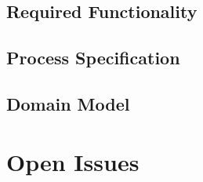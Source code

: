 \documentclass[12pt]{article}
\begin{document}
\subsection{Required Functionality}

\subsection{Process Specification}
 
\subsection{Domain Model}


\section{Open Issues}
\end{document}
